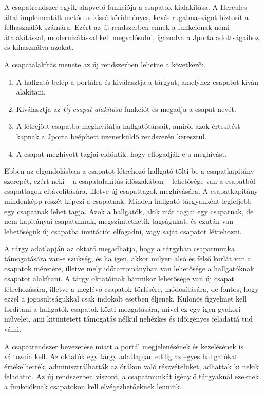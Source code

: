 A csapatrendszer egyik alapvető funkciója a csapatok kialakítása.
A Hercules által implementált metódus kissé körülményes, kevés rugalmasságot biztosít a felhasználók számára.
Ezért az új rendszerben ennek a funkciónak némi átalakítással, modernizálással kell megvalósulni, igazodva a Jporta adottságaihoz, és kihasználva azokat.

A csapatalakítás menete az új rendszerben lehetne a következő:
\begin{enumerate}
    \item A hallgató belép a portálra és kiválasztja a tárgyat, amelyhez csapatot kíván alakítani.
    \item Kiválasztja az \textit{Új csapat alakítása} funkciót és megadja a csapat nevét.
    \item A létrejött csapatba meginvitálja hallgatótársait, amiről azok értesítést kapnak a Jporta beépített üzenetküldő rendszerén keresztül.
    \item A csapat meghívott tagjai eldöntik, hogy elfogadják-e a meghívást.
\end{enumerate}
Ebben az elgondolásban a csapatot létrehozó hallgató tölti be a csapatkapitány szerepét, ezért neki -- a csapatalakítás időszakában -- lehetősége van a csapatból csapattagok eltávolítására, illetve új csapattagok meghívására.
A csapatkapitány mindenképp részét képezi a csapatnak.
Minden hallgató tárgyanként legfeljebb egy csapatnak lehet tagja.
Azok a hallgatók, akik már tagjai egy csapatnak, de nem kapitányai csapatuknak, megszüntethetik tagságukat, és ezután van lehetőségük új csapatba invitációt elfogadni, vagy saját csapatot létrehozni.

A tárgy adatlapján az oktató megadhatja, hogy a tárgyban csapatmunka támogatására van-e szükség, és ha igen, akkor milyen alsó és felső korlát van a csapatok méretére, illetve mely időtartományban van lehetősége a hallgatóknak csapatot alakítani.
A tárgy oktatóinak bármikor lehetősége van új csapat létrehozására, illetve a meglévő csapatok törlésére, módosítására, de fontos, hogy ezzel a jogosultságukkal csak indokolt esetben éljenek.
Különös figyelmet kell fordítani a hallgatók csapatok közti mozgatására, mivel ez egy igen gyakori művelet, ami kitüntetett támogatás nélkül nehézkes és időigényes feladattá tud válni.

A csapatrendszer bevezetése miatt a portál megjelenésének és kezelésének is változnia kell.
Az oktatók egy tárgy adatlapján eddig az egyes hallgatókat értékelhették, adminisztrálhatták az órákon való részvételüket, adhattak ki nekik feladatot.
Az új rendszerben viszont, a csapatmunkát igénylő tárgyaknál ezeknek a funkcióknak csapatokon kell elvégezhetőeknek lenniük.


